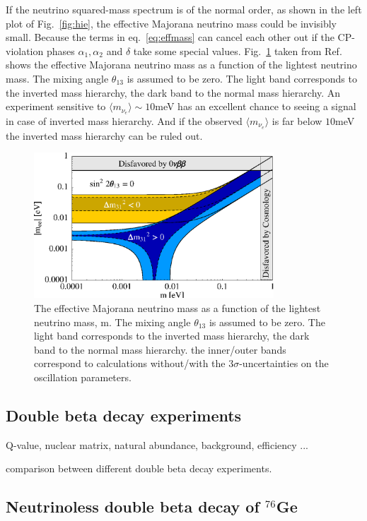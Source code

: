 If the neutrino squared-mass spectrum is of the normal order, as shown
in the left plot of Fig.~\ref{fig:hie}, the effective Majorana
neutrino mass could be invisibly small. Because the terms in
eq.~\ref{eq:effmass} can cancel each other out if the CP-violation
phases $\alpha_{1}, \alpha_{2}$ and $\delta$ take some special values.
Fig.~\ref{fig:effmvmm} taken from Ref.~\cite{Mer06} shows the
effective Majorana neutrino mass as a function of the lightest
neutrino mass. The mixing angle $\theta_{13}$ is assumed to be zero.
The light band corresponds to the inverted mass hierarchy, the dark
band to the normal mass hierarchy. An experiment sensitive to $\langle
m_{\nu_{e}} \rangle \sim 10$meV has an excellent chance to seeing a
signal in case of inverted mass hierarchy. And if the observed
$\langle m_{\nu_{e}} \rangle$ is far below $10$meV the inverted mass
hierarchy can be ruled out.
\begin{figure}[tbhp]
  \centering
  \includegraphics[width=0.8\textwidth]{mnueVm.eps}  
  \caption{The effective Majorana neutrino mass as a function of the
lightest neutrino mass, m. The mixing angle $\theta_{13}$ is assumed
to be zero. The light band corresponds to the inverted mass hierarchy,
the dark band to the normal mass hierarchy. the inner/outer bands
correspond to calculations without/with the $3\sigma$-uncertainties on
the oscillation parameters. }
  \label{fig:effmvmm}
\end{figure}

\subsection{Double beta decay experiments}
\label{sec:genremark}
Q-value, nuclear matrix, natural abundance, background, efficiency ...

comparison between different double beta decay experiments.

\subsection{Neutrinoless double beta decay of $^{76}$Ge}
\label{sec:ge76}

